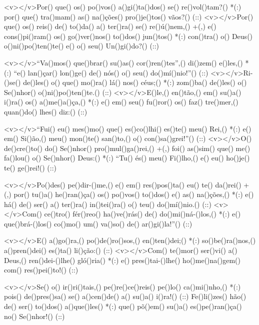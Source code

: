 <v></v>Por() que() os() po()vos() a()gi()ta()dos() se() re()vol()tam?() *(:)
por() que() tra()mam() as() na()ções() pro()je()tos() vãos?() (::)
<v></v>Por() que() os() reis() de() to()da() a() ter()ra() se() re()ú()nem,() +(,)
e() cons()pi()ram() os() go()ver()nos() to()dos() jun()tos() *(:)
con()tra() o() Deus() o()ni()po()ten()te() e() o() seu() Un()gi()do?() (::)

<v></v>``Va()mos() que()brar() su()as() cor()ren()tes'',() di()zem() e()les,() *(:)
``e() lan()çar() lon()ge() de() nós() o() seu() do()mí()nio!''() (::)
<v></v>Ri-()se() de()les() o() que() mo()ra() lá() nos() céus;() *(:)
zom()ba() de()les() o() Se()nhor() o()ni()po()ten()te.() (::)
<v></v>E()le,() en()tão,() em() su()a() i()ra() os() a()me()a()ça,() *(:)
e() em() seu() fu()ror() os() faz() tre()mer,() quan()do() lhes() diz:() (::)

<v></v>``Fui() eu() mes()mo() que() es()co()lhi() es()te() meu() Rei,() *(:)
e() em() Si()ão,() meu() mon()te() san()to,() o() con()sa()grei!''() (::)
<v></v>O() de()cre()to() do() Se()nhor() pro()mul()ga()rei,() +(,)
foi() as()sim() que() me() fa()lou() o() Se()nhor() Deus:() *(:)
``Tu() és() meu() Fi()lho,() e() eu() ho()je() te() ge()rei!() (::)

<v></v>Po()des() pe()dir-()me,() e() em() res()pos()ta() eu() te() da()rei() +(,)
por() tu()a() he()ran()ça() os() po()vos() to()dos() e() as() na()ções,() *(:)
e() há() de() ser() a() ter()ra() in()tei()ra() o() teu() do()mí()nio.() (::)
<v></v>Com() ce()tro() fér()reo() ha()ve()rás() de() do()mi()ná-()los,() *(:)
e() que()brá-()los() co()mo() um() va()so() de() ar()gi()la!''() (::)

<v></v>E() a()go()ra,() po()de()ro()sos,() en()ten()dei;() *(:)
so()be()ra()nos,() a()pren()dei() es()ta() li()ção:() (::)
<v></v>Com() te()mor() ser()vi() a() Deus,() ren()dei-()lhe() gló()ria() *(:)
e() pres()tai-()lhe() ho()me()na()gem() com() res()pei()to!() (::)

<v></v>Se() o() ir()ri()tais,() pe()re()ce()reis() pe()lo() ca()mi()nho,() *(:)
pois() de()pres()sa() se() a()cen()de() a() su()a() i()ra!() (::)
Fe()li()zes() hão() de() ser() to()dos() a()que()les() *(:)
que() põ()em() su()a() es()pe()ran()ça() no() Se()nhor!() (::)